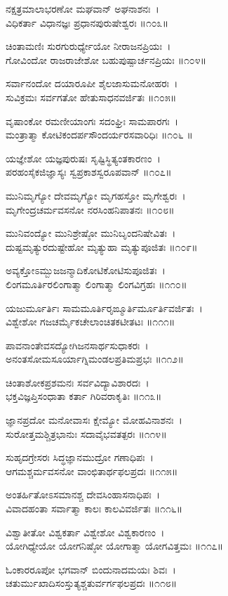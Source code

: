 	ನಕ್ಷತ್ರಮಾಲಾಭರಣೋ ಮಘವಾನ್ ಅಘನಾಶನಃ~।\\
	ವಿಧಿಕರ್ತಾ ವಿಧಾನಜ್ಞಃ ಪ್ರಧಾನಪುರುಷೇಶ್ವರಃ ॥೧೦೩॥

ಚಿಂತಾಮಣಿಃ ಸುರಗುರುರ್ಧ್ಯೇಯೋ ನೀರಾಜನಪ್ರಿಯಃ~।\\
ಗೋವಿಂದೋ ರಾಜರಾಜೇಶೋ ಬಹುಪುಷ್ಪಾರ್ಚನಪ್ರಿಯಃ ॥೧೦೪॥

ಸರ್ವಾನಂದೋ ದಯಾರೂಪೀ ಶೈಲಜಾಸುಮನೋಹರಃ~।\\
ಸುವಿಕ್ರಮಃ ಸರ್ವಗತೋ ಹೇತುಸಾಧನವರ್ಜಿತಃ ॥೧೦೫॥

	ವೃಷಾಂಕೋ ರಮಣೀಯಾಂಗಃ ಸದಂಘ್ರಿಃ ಸಾಮಪಾರಗಃ~।\\
	ಮಂತ್ರಾತ್ಮಾ ಕೋಟಿಕಂದರ್ಪಸೌಂದರ್ಯರಸವಾರಿಧಿಃ ॥೧೦೬ ॥

ಯಜ್ಞೇಶೋ ಯಜ್ಞಪುರುಷಃ ಸೃಷ್ಟಿಸ್ಥಿತ್ಯಂತಕಾರಣಂ~।\\
ಪರಹಂಸೈಕಜಿಜ್ಞಾಸ್ಯಃ ಸ್ವಪ್ರಕಾಶಸ್ವರೂಪವಾನ್ ॥೧೦೭॥

	ಮುನಿಮೃಗ್ಯೋ ದೇವಮೃಗ್ಯೋ ಮೃಗಹಸ್ತೋ ಮೃಗೇಶ್ವರಃ~।\\
	ಮೃಗೇಂದ್ರಚರ್ಮವಸನೋ ನರಸಿಂಹನಿಪಾತನಃ ॥೧೦೮॥

ಮುನಿವಂದ್ಯೋ ಮುನಿಶ್ರೇಷ್ಠೋ ಮುನಿಬೃಂದನಿಷೇವಿತಃ~।\\
ದುಷ್ಟಮೃತ್ಯುರದುಷ್ಟೇಹೋ ಮೃತ್ಯುಹಾ ಮೃತ್ಯುಪೂಜಿತಃ ॥೧೦೯॥

	ಅವ್ಯಕ್ತೋಽಮ್ಬುಜಜನ್ಮಾದಿಕೋಟಿಕೋಟಿಸುಪೂಜಿತಃ~।\\
	ಲಿಂಗಮೂರ್ತಿರಲಿಂಗಾತ್ಮಾ ಲಿಂಗಾತ್ಮಾ ಲಿಂಗವಿಗ್ರಹಃ ॥೧೧೦॥

ಯಜುರ್ಮೂರ್ತಿಃ ಸಾಮಮೂರ್ತಿರೃಙ್ಮೂರ್ತಿರ್ಮೂರ್ತಿವರ್ಜಿತಃ~।\\
ವಿಶ್ವೇಶೋ ಗಜಚರ್ಮೈಕಚೇಲಾಂಚಿತಕಟೀತಟಃ ॥೧೧೧॥

	ಪಾವನಾಂತೇವಸದ್ಯೋಗಿಜನಸಾರ್ಥಸುಧಾಕರಃ~।\\
	ಅನಂತಸೋಮಸೂರ್ಯಾಗ್ನಿಮಂಡಲಪ್ರತಿಮಪ್ರಭಃ ॥೧೧೨॥

ಚಿಂತಾಶೋಕಪ್ರಶಮನಃ ಸರ್ವವಿದ್ಯಾವಿಶಾರದಃ~।\\
ಭಕ್ತವಿಜ್ಞಪ್ತಿಸಂಧಾತಾ ಕರ್ತಾ ಗಿರಿವರಾಕೃತಿಃ ॥೧೧೩॥

	ಜ್ಞಾನಪ್ರದೋ ಮನೋವಾಸಃ ಕ್ಷೇಮ್ಯೋ ಮೋಹವಿನಾಶನಃ~।\\
	ಸುರೋತ್ತಮಶ್ಚಿತ್ರಭಾನುಃ ಸದಾವೈಭವತತ್ಪರಃ ॥೧೧೪॥

ಸುಹೃದಗ್ರೇಸರಃ ಸಿದ್ಧಜ್ಞಾನಮುದ್ರೋ ಗಣಾಧಿಪಃ~।\\
ಆಗಮಶ್ಚರ್ಮವಸನೋ ವಾಂಛಿತಾರ್ಥಫಲಪ್ರದಃ ॥೧೧೫॥

	ಅಂತರ್ಹಿತೋಽಸಮಾನಶ್ಚ ದೇವಸಿಂಹಾಸನಾಧಿಪಃ~।\\
	ವಿವಾದಹಂತಾ ಸರ್ವಾತ್ಮಾ ಕಾಲಃ ಕಾಲವಿವರ್ಜಿತಃ ॥೧೧೬॥

ವಿಶ್ವಾತೀತೋ ವಿಶ್ವಕರ್ತಾ ವಿಶ್ವೇಶೋ ವಿಶ್ವಕಾರಣಂ~।\\
ಯೋಗಿಧ್ಯೇಯೋ ಯೋಗನಿಷ್ಠೋ ಯೋಗಾತ್ಮಾ ಯೋಗವಿತ್ತಮಃ ॥೧೧೭॥

	ಓಂಕಾರರೂಪೋ ಭಗವಾನ್ ಬಿಂದುನಾದಮಯಃ ಶಿವಃ~।\\
	ಚತುರ್ಮುಖಾದಿಸಂಸ್ತುತ್ಯಶ್ಚತುರ್ವರ್ಗಫಲಪ್ರದಃ ॥೧೧೮॥

